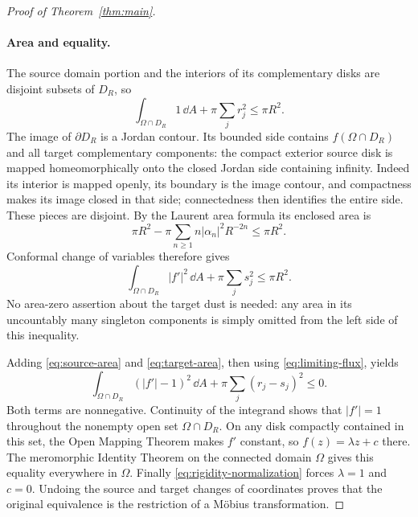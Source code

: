 \begin{proof}[Proof of Theorem~\ref{thm:main}]
\paragraph{Area and equality.}
The source domain portion and the interiors of its complementary
disks are disjoint subsets of $D_R$, so
\begin{equation}\label{eq:source-area}
 \int_{\Omega\cap D_R}1\,\dd A+\pi\sum_jr_j^2\le\pi R^2.
\end{equation}
The image of $\partial D_R$ is a Jordan contour.  Its bounded side
contains $f(\Omega\cap D_R)$ and all target complementary components:
the compact exterior source disk is mapped homeomorphically onto the
closed Jordan side containing infinity.  Indeed its interior is mapped
openly, its boundary is the image contour, and compactness makes its
image closed in that side; connectedness then identifies the entire
side.  These pieces are disjoint.  By the Laurent
area formula its enclosed area is
\[
 \pi R^2-\pi\sum_{n\ge1}n|\alpha_n|^2R^{-2n}\le\pi R^2.
\]
Conformal change of variables therefore gives
\begin{equation}\label{eq:target-area}
 \int_{\Omega\cap D_R}|f'|^2\,\dd A
       +\pi\sum_js_j^2\le\pi R^2.
\end{equation}
No area-zero assertion about the target dust is needed: any area in
its uncountably many singleton components is simply omitted from
the left side of this inequality.

Adding \eqref{eq:source-area} and \eqref{eq:target-area}, then using
\eqref{eq:limiting-flux}, yields
\begin{equation}\label{eq:nonnegative-rigidity}
 \boxed{\displaystyle
 \int_{\Omega\cap D_R}(|f'|-1)^2\,\dd A
       +\pi\sum_j(r_j-s_j)^2\le0.}
\end{equation}
Both terms are nonnegative.  Continuity of the integrand shows that
$|f'|=1$ throughout the nonempty open set $\Omega\cap D_R$.  On any
disk compactly contained in this set, the Open Mapping Theorem makes
$f'$ constant, so $f(z)=\lambda z+c$ there.  The meromorphic Identity
Theorem on the connected domain $\Omega$ gives this equality
everywhere in $\Omega$.  Finally
\eqref{eq:rigidity-normalization} forces $\lambda=1$ and $c=0$.
Undoing the source and target changes of coordinates proves that the
original equivalence is the restriction of a M\"obius transformation.
\end{proof}
